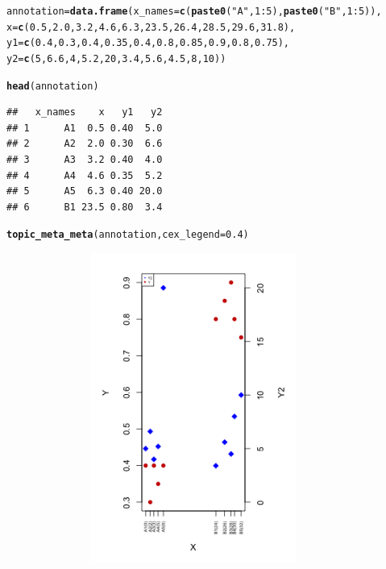 \documentclass[12pt]{article}\usepackage[]{graphicx}\usepackage[usenames,dvipsnames]{color}
\makeatletter
\newcommand{\hlnum}[1]{\textcolor[rgb]{0.686,0.059,0.569}{#1}}%
\newcommand{\hlstr}[1]{\textcolor[rgb]{0.192,0.494,0.8}{#1}}%
\newcommand{\hlopt}[1]{\textcolor[rgb]{0,0,0}{#1}}%
\newcommand{\hlstd}[1]{\textcolor[rgb]{0.345,0.345,0.345}{#1}}%
\newcommand{\hlkwb}[1]{\textcolor[rgb]{0.69,0.353,0.396}{#1}}%
\newcommand{\hlkwc}[1]{\textcolor[rgb]{0.333,0.667,0.333}{#1}}%
\newcommand{\hlkwd}[1]{\textcolor[rgb]{0.737,0.353,0.396}{\textbf{#1}}}%
\newenvironment{kframe}{%
 \def\at@end@of@kframe{}%
 \ifinner\ifhmode%
  \def\at@end@of@kframe{\end{minipage}}%
  \begin{minipage}{\columnwidth}%
 \fi\fi%
 \def\FrameCommand##1{\hskip\@totalleftmargin \hskip-\fboxsep
 \colorbox{shadecolor}{##1}\hskip-\fboxsep
     \hskip-\linewidth \hskip-\@totalleftmargin \hskip\columnwidth}%
 \MakeFramed {\advance\hsize-\width
   \@totalleftmargin\z@ \linewidth\hsize
   \@setminipage}}%
 {\par\unskip\endMakeFramed%
 \at@end@of@kframe}
\newenvironment{knitrout}{}{} %
\makeatother
\begin{document}
\begin{knitrout}
\color{fgcolor}\begin{kframe}
\begin{alltt}
\hlstd{annotation} \hlkwb{=} \hlkwd{data.frame}\hlstd{(}\hlkwc{x_names} \hlstd{=} \hlkwd{c}\hlstd{(}\hlkwd{paste0}\hlstd{(}\hlstr{"A"}\hlstd{,}\hlnum{1}\hlopt{:}\hlnum{5}\hlstd{),} \hlkwd{paste0}\hlstd{(}\hlstr{"B"}\hlstd{,}\hlnum{1}\hlopt{:}\hlnum{5}\hlstd{)),}
\hlkwc{x} \hlstd{=} \hlkwd{c}\hlstd{(}\hlnum{0.5}\hlstd{,}\hlnum{2.0}\hlstd{,} \hlnum{3.2}\hlstd{,} \hlnum{4.6}\hlstd{,} \hlnum{6.3}\hlstd{,}  \hlnum{23.5}\hlstd{,} \hlnum{26.4}\hlstd{,} \hlnum{28.5}\hlstd{,} \hlnum{29.6}\hlstd{,} \hlnum{31.8}\hlstd{),}
\hlkwc{y1} \hlstd{=} \hlkwd{c}\hlstd{(}\hlnum{0.4}\hlstd{,} \hlnum{0.3}\hlstd{,} \hlnum{0.4}\hlstd{,} \hlnum{0.35}\hlstd{,} \hlnum{0.4}\hlstd{,} \hlnum{0.8}\hlstd{,} \hlnum{0.85}\hlstd{,} \hlnum{0.9}\hlstd{,} \hlnum{0.8}\hlstd{,} \hlnum{0.75}\hlstd{),}
\hlkwc{y2} \hlstd{=}\hlkwd{c}\hlstd{(}\hlnum{5}\hlstd{,} \hlnum{6.6}\hlstd{,} \hlnum{4}\hlstd{,} \hlnum{5.2}\hlstd{,} \hlnum{20}\hlstd{,} \hlnum{3.4}\hlstd{,} \hlnum{5.6}\hlstd{,} \hlnum{4.5}\hlstd{,} \hlnum{8}\hlstd{,} \hlnum{10}\hlstd{))}

\hlkwd{head}\hlstd{(annotation)}
\end{alltt}
\begin{verbatim}
##   x_names    x   y1   y2
## 1      A1  0.5 0.40  5.0
## 2      A2  2.0 0.30  6.6
## 3      A3  3.2 0.40  4.0
## 4      A4  4.6 0.35  5.2
## 5      A5  6.3 0.40 20.0
## 6      B1 23.5 0.80  3.4
\end{verbatim}
\begin{alltt}
\hlkwd{topic_meta_meta}\hlstd{(annotation,} \hlkwc{cex_legend} \hlstd{=} \hlnum{0.4}\hlstd{)}
\end{alltt}
\end{kframe}
\end{knitrout}

\begin{figure}[htp]
\begin{center}
\includegraphics[width=4in,height=4in]{figure/topic_meta_meta-1.png}
\end{center}
\end{figure}
\end{document}
